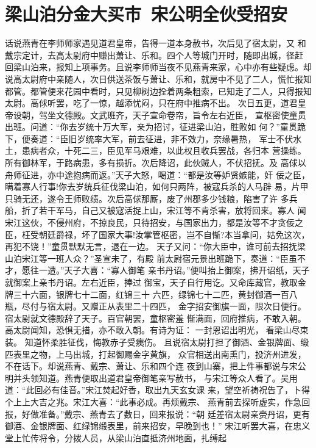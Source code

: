 \chapter{梁山泊分金大买市~宋公明全伙受招安}

话说燕青在李师师家遇见道君皇帝，告得一道本身赦书，次后见了宿太尉，又
和戴宗定计，去高太尉府中赚出萧让、乐和。四个人等城门开时，随即出城，径赶
回梁山泊来，报知上项事务。且说李师师当夜不见燕青来家，心中亦有些疑虑。却
说高太尉府中亲随人，次日供送茶饭与萧让、乐和，就房中不见了二人，慌忙报知
都管。都管便来花园中看时，只见柳树边拴着两条粗索，已知走了二人，只得报知
太尉。高俅听罢，吃了一惊，越添忧闷，只在府中推病不出。
次日五更，道君皇帝设朝，驾坐文德殿。文武班齐，天子宣命卷帘，旨令左右近臣，
宣枢密使童贯出班。问道：“你去岁统十万大军，亲为招讨，征进梁山泊，胜败如
何？”童贯跪下，便奏道：“臣旧岁统率大军，前去征进，非不效力，奈缘暑热，
军士不伏水土，患病者众，十死二三，臣见军马艰难，以此权且收兵罢战，各归本
营操练。所有御林军，于路病患，多有损折。次后降诏，此伙贼人，不伏招抚。及
高俅以舟师征进，亦中途抱病而返。”天子大怒，喝道：“都是汝等妒贤嫉能，奸
佞之臣，瞒着寡人行事!你去岁统兵征伐梁山泊，如何只两阵，被寇兵杀的人马辟
易，片甲只骑无还，遂令王师败绩。次后高俅那厮，废了州郡多少钱粮，陷害了许
多兵船，折了若干军马，自己又被寇活捉上山，宋江等不肯杀害，放将回来。寡人
闻宋江这伙，不侵州府，不掠良民，只待招安，与国家出力，都是汝等不才贪佞之
臣，枉受朝廷爵禄，坏了国家大事!汝掌管枢密，岂不自惭?本当拿问，姑免这次，
再犯不饶！”童贯默默无言，退在一边。
天子又问：“你大臣中，谁可前去招抚梁山泊宋江等一班人众？”圣宣未了，有殿
前太尉宿元景出班跪下，奏道：“臣虽不才，愿往一遭。”天子大喜：“寡人御笔
亲书丹诏。”便叫抬上御案，拂开诏纸，天子就御案上亲书丹诏。左右近臣，捧过
御宝，天子自行用讫。又命库藏官，教取金牌三十六面，银牌七十二面，红锦三十
六匹，绿锦七十二匹，黄封御酒一百八瓶，尽付与宿太尉。又赠正从表里二十四匹，
金字招安御旗一面，限次日便行。宿太尉就文德殿辞了天子。百官朝罢，童枢密羞
惭满面，回府推病，不敢入朝。高太尉闻知，恐惧无措，亦不敢入朝。有诗为证：
一封恩诏出明光，看梁山尽束装。
知道怀柔胜征伐，悔教赤子受痍伤。
且说宿太尉打担了御酒、金银牌面、缎匹表里之物，上马出城，打起御赐金字黄旗，
众官相送出南熏门，投济州进发，不在话下。却说燕青、戴宗、萧让、乐和四个连
夜到山寨，把上件事都说与宋公明并头领知道。燕青便取出道君皇帝御笔亲写赦书，
与宋江等众人看了。吴用道：“此回必有佳音。”宋江焚起好香，取出九天玄女课
来，望空祈祷祝告了，卜得个上上大吉之兆。宋江大喜：“此事必成。再烦戴宗、
燕青前去探听虚实，作急回报，好做准备。”戴宗、燕青去了数日，回来报说：“朝
廷差宿太尉亲赍丹诏，更有御酒、金银牌面、红绿锦缎表里，前来招安，早晚到也！”
宋江听罢大喜，在忠义堂上忙传将令，分拨人员，从梁山泊直抵济州地面，扎缚起
